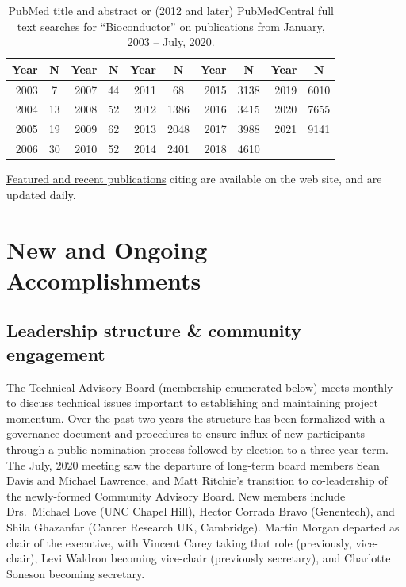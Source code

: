 \documentclass[letterpaper]{article}
\begin{document}
\begin{table}
  \caption{PubMed title and abstract or (2012 and later) PubMedCentral full text searches for ``Bioconductor'' on
    publications from January, 2003 -- July, 2020.}
  \label{table:pubMed}
  \begin{center}
    \begin{tabular}{rc|rc|rc|rc|rc}
      Year &  N & Year &  N & Year &    N & Year  & N    & Year  & N\\\hline\noalign{\smallskip}
      2003 &  7 & 2007 & 44 & 2011 &   68 & 2015  & 3138 & 2019  & 6010 \\
      2004 & 13 & 2008 & 52 & 2012 & 1386 & 2016  & 3415 & 2020 & 7655 \\
      2005 & 19 & 2009 & 62 & 2013 & 2048 & 2017  & 3988 & 2021 & 9141 \\
      2006 & 30 & 2010 & 52 & 2014 & 2401 & 2018  & 4610 & \\
    \end{tabular}
  \end{center}
\end{table}

\href{https://bioconductor.org/help/publications/}{Featured and recent
  publications} citing \Bioconductor{} are available on the
\Bioconductor{} web site, and are updated daily. 

\section{New and Ongoing Accomplishments}

\subsection{Leadership structure \& community engagement}

The Technical Advisory Board (membership enumerated below) meets
monthly to discuss technical issues important to establishing and
maintaining project momentum. Over the past two years the structure
has been formalized with a governance document and procedures to
ensure influx of new participants through a public nomination process
followed by election to a three year term. The July, 2020 meeting saw
the departure of long-term board members Sean Davis and Michael
Lawrence, and Matt Ritchie's transition to co-leadership of the
newly-formed Community Advisory Board. New members include
Drs.\ Michael Love (UNC Chapel Hill), Hector Corrada Bravo
(Genentech), and Shila Ghazanfar (Cancer Research UK,
Cambridge). Martin Morgan departed as chair of the executive, with
Vincent Carey taking that role (previously, vice-chair), Levi Waldron
becoming vice-chair (previously secretary), and Charlotte Soneson
becoming secretary.
\end{document}
